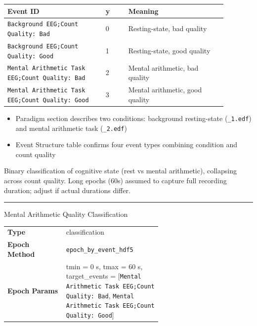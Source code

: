{\begin{tcolorbox}
\par{}\par\smallskip
\begingroup\footnotesize
\begin{tabular}{@{}p{0.3911\linewidth}p{0.0978\linewidth}p{0.3911\linewidth}@{}}
\toprule
\textbf{Event ID} & \textbf{y} & \textbf{Meaning} \\
\midrule
\texttt{Background EEG;Count Quality: Bad} & 0 & Resting-state, bad quality \\
\texttt{Background EEG;Count Quality: Good} & 1 & Resting-state, good quality \\
\texttt{Mental Arithmetic Task EEG;Count Quality: Bad} & 2 & Mental arithmetic, bad quality \\
\texttt{Mental Arithmetic Task EEG;Count Quality: Good} & 3 & Mental arithmetic, good quality \\
\bottomrule
\end{tabular}
\endgroup
\par{}\par
\begin{itemize}[leftmargin=1.3em,noitemsep,topsep=1pt]
\item[\scriptsize$\cdot$] {\scriptsize Paradigm section describes two conditions: background resting-state (\texttt{\_1.edf}) and mental arithmetic task (\texttt{\_2.edf})}
\item[\scriptsize$\cdot$] {\scriptsize Event Structure table confirms four event types combining condition and count quality}
\end{itemize}
\par{} {\footnotesize Binary classification of cognitive state (rest vs mental arithmetic), collapsing across count quality. Long epochs (60s) assumed to capture full recording duration; adjust if actual durations differ.}
\noindent\rule{\linewidth}{0.7pt}\par\nopagebreak
{} {\footnotesize Mental Arithmetic Quality Classification}\par\smallskip
{\footnotesize\begin{tabular}{@{}lp{0.62\linewidth}@{}}
\textbf{Type} & classification \\
\textbf{Epoch Method} & \texttt{epoch\_by\_event\_hdf5} \\
\textbf{Epoch Params} & tmin = 0 s, tmax = 60 s, target\_events = [\texttt{Mental Arithmetic Task EEG;Count Quality: Bad}, \texttt{Mental Arithmetic Task EEG;Count Quality: Good}] \\

\end{tabular}}
\end{tcolorbox}}
